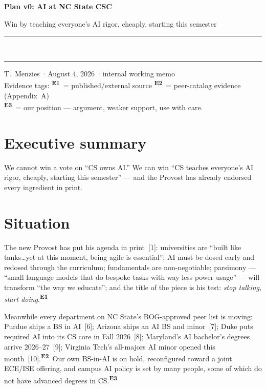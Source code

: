\documentclass[11pt]{article}
\newcommand{\Ecite}{\textsuperscript{\color{wolf}\sffamily\bfseries E1}}   %
\newcommand{\Epeer}{\textsuperscript{\color{wolf}\sffamily\bfseries E2}}   %
\newcommand{\Epos}{\textsuperscript{\color{inkgray}\sffamily\bfseries E3}} %
\begin{document}
{\sffamily\bfseries\huge Plan v0: AI at NC State CSC\par}
\vspace{2pt}
{\sffamily\large\color{inkgray} Win by teaching everyone's AI rigor, cheaply, starting this semester\par}
\vspace{6pt}
{\color{wolf}\rule{\linewidth}{1.4pt}}\\[-2pt]
{\color{wolf!40}\rule{\linewidth}{0.5pt}}
\vspace{4pt}

{\color{inkgray}\sffamily T.~Menzies \quad·\quad August 4, 2026 \quad·\quad internal working memo\\
Evidence tags: \Ecite\ = published/external source \quad \Epeer\ = peer-catalog evidence (Appendix~A)\\
\Epos\ = our position --- argument, weaker support, use with care.\par}
\vspace{0.4em}
\section*{Executive summary}
We cannot win a vote on ``CS owns AI.'' We can win ``CS teaches everyone's AI rigor, cheaply, starting this semester'' --- and the Provost has already endorsed every ingredient in print.

\vfill
{\sffamily\tableofcontents}

\newpage
\section{Situation}

The new Provost has put his agenda in print~[1]: universities are ``built like tanks\ldots yet at this moment, being agile is essential''; AI must be dosed early and redosed through the curriculum; fundamentals are non-negotiable; parsimony --- ``small language models that do bespoke tasks with way less power usage'' --- will transform ``the way we educate''; and the title of the piece is his test: \emph{stop talking, start doing}.\Ecite

Meanwhile every department on NC State's BOG-approved peer list is moving: Purdue ships a BS in AI~[6]; Arizona ships an AI BS and minor~[7]; Duke puts required AI into its CS core in Fall 2026~[8]; Maryland's AI bachelor's degrees arrive 2026--27~[9]; Virginia Tech's all-majors AI minor opened this month~[10].\Epeer\ Our own BS-in-AI is on hold, reconfigured toward a joint ECE/ISE offering, and campus AI policy is set by many people, some of which do not have advanced degrees in CS.\Epos
\end{document}
